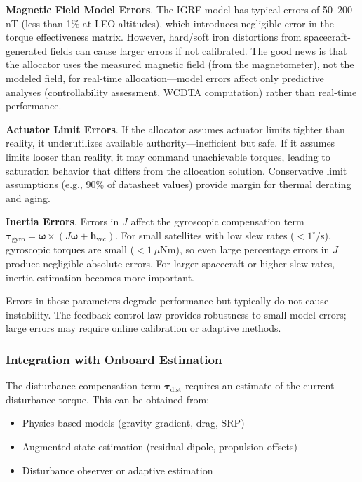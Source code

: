 \documentclass[conference]{IEEEtran}
\begin{document}
\textbf{Magnetic Field Model Errors}. The IGRF model has typical errors of 50--200 nT (less than 1\% at LEO altitudes), which introduces negligible error in the torque effectiveness matrix. However, hard/soft iron distortions from spacecraft-generated fields can cause larger errors if not calibrated. The good news is that the allocator uses the measured magnetic field (from the magnetometer), not the modeled field, for real-time allocation---model errors affect only predictive analyses (controllability assessment, WCDTA computation) rather than real-time performance.

\textbf{Actuator Limit Errors}. If the allocator assumes actuator limits tighter than reality, it underutilizes available authority---inefficient but safe. If it assumes limits looser than reality, it may command unachievable torques, leading to saturation behavior that differs from the allocation solution. Conservative limit assumptions (e.g., 90\% of datasheet values) provide margin for thermal derating and aging.

\textbf{Inertia Errors}. Errors in $J$ affect the gyroscopic compensation term $\boldsymbol{\tau}_{\text{gyro}} = \boldsymbol{\omega} \times (J\boldsymbol{\omega} + \mathbf{h}_{\text{vec}})$. For small satellites with low slew rates ($<1^\circ$/s), gyroscopic torques are small ($<1~\mu$Nm), so even large percentage errors in $J$ produce negligible absolute errors. For larger spacecraft or higher slew rates, inertia estimation becomes more important.

Errors in these parameters degrade performance but typically do not cause instability. The feedback control law provides robustness to small model errors; large errors may require online calibration or adaptive methods.

\subsubsection{Integration with Onboard Estimation}
The disturbance compensation term $\boldsymbol{\tau}_{\text{dist}}$ requires an estimate of the current disturbance torque. This can be obtained from:
\begin{itemize}
    \item Physics-based models (gravity gradient, drag, SRP)
    \item Augmented state estimation (residual dipole, propulsion offsets)
    \item Disturbance observer or adaptive estimation
\end{itemize}
\end{document}
